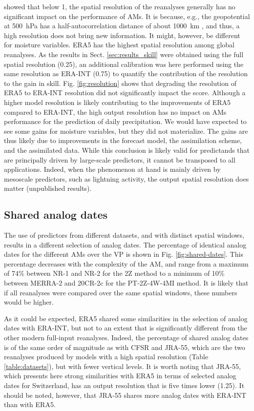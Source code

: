 \documentclass[alpha-refs]{wiley-article}
\begin{document}
\citet{Horton2018b} showed that below 1\degree, the spatial resolution of the reanalyses generally has no significant impact on the performance of AMs. It is because, e.g., the geopotential at 500~hPa has a half-autocorrelation distance of about 1000~km \cite{Thiebaux1985}, and thus, a high resolution does not bring new information. It might, however, be different for moisture variables. ERA5 has the highest spatial resolution among global reanalyses. As the results in Sect. \ref{sec:results_skill} were obtained using the full spatial resolution (0.25\degree), an additional calibration was here performed using the same resolution as ERA-INT (0.75\degree) to quantify the contribution of the resolution to the gain in skill. Fig. \ref{fig:resolution} shows that degrading the resolution of ERA5 to ERA-INT resolution did not significantly impact the score. Although a higher model resolution is likely contributing to the improvements of ERA5 compared to ERA-INT, the high output resolution has no impact on AMs performance for the prediction of daily precipitation. We would have expected to see some gains for moisture variables, but they did not materialize. The gains are thus likely due to improvements in the forecast model, the assimilation scheme, and the assimilated data. While this conclusion is likely valid for predictands that are principally driven by large-scale predictors, it cannot be transposed to all applications. Indeed, when the phenomenon at hand is mainly driven by mesoscale predictors, such as lightning activity, the output spatial resolution does matter (unpublished results).


\subsection{Shared analog dates}
\label{sec:results_shared_dates}

The use of predictors from different datasets, and with distinct spatial windows, results in a different selection of analog dates. The percentage of identical analog dates for the different AMs over the VP is shown in Fig. \ref{fig:shared-dates}. This percentage decreases with the complexity of the AM, and range from a maximum of 74\% between NR-1 and NR-2 for the 2Z method to a minimum of 10\% between MERRA-2 and 20CR-2c for the PT-2Z-4W-4MI method. It is likely that if all reanalyses were compared over the same spatial windows, these numbers would be higher.

As it could be expected, ERA5 shared some similarities in the selection of analog dates with ERA-INT, but not to an extent that is significantly different from the other modern full-input reanalyses. Indeed, the percentage of shared analog dates is of the same order of magnitude as with CFSR and JRA-55, which are the two reanalyses produced by models with a high spatial resolution (Table \ref{table:datasets}), but with fewer vertical levels. It is worth noting that JRA-55, which presents here strong similarities with ERA5 in terms of selected analog dates for Switzerland, has an output resolution that is five times lower (1.25\degree). It should be noted, however, that JRA-55 shares more analog dates with ERA-INT than with ERA5. 
\end{document}
